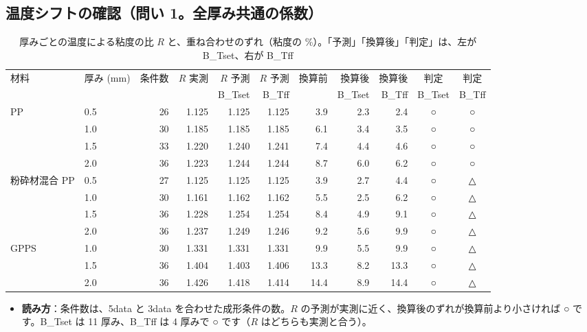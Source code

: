 \documentclass[paper=a4paper,fontsize=10.5pt,line_length=44zw,number_of_lines=38]{jlreq}
\newenvironment{points}{\begin{itemize}[label=$\triangleright$,leftmargin=1.5\zw,itemsep=0.3ex,topsep=0.5ex,parsep=0pt]}{\end{itemize}}
\newcommand{\pt}[1]{\item \textbf{#1}：}
\begin{document}
\subsection{温度シフトの確認（問い 1。全厚み共通の係数）}
\begin{table}[H]
\caption{厚みごとの温度による粘度の比 $R$ と、重ね合わせのずれ（粘度の \%）。「予測」「換算後」「判定」は、左が B\_Tset、右が B\_Tff}\label{tab:check}
\scriptsize
\begin{tabularx}{\linewidth}{@{}llrrrrrrrcc@{}}
\toprule
材料 & 厚み (mm) & 条件数 & $R$ 実測 & $R$ 予測 & $R$ 予測 & 換算前 & 換算後 & 換算後 & 判定 & 判定 \\
 & & & & B\_Tset & B\_Tff & & B\_Tset & B\_Tff & B\_Tset & B\_Tff \\
\midrule
PP & 0.5 & 26 & 1.125 & 1.125 & 1.125 & 3.9 & 2.3 & 2.4 & ○ & ○ \\
 & 1.0 & 30 & 1.185 & 1.185 & 1.185 & 6.1 & 3.4 & 3.5 & ○ & ○ \\
 & 1.5 & 33 & 1.220 & 1.240 & 1.241 & 7.4 & 4.4 & 4.6 & ○ & ○ \\
 & 2.0 & 36 & 1.223 & 1.244 & 1.244 & 8.7 & 6.0 & 6.2 & ○ & ○ \\
\midrule
粉砕材混合 PP & 0.5 & 27 & 1.125 & 1.125 & 1.125 & 3.9 & 2.7 & 4.4 & ○ & △ \\
 & 1.0 & 30 & 1.161 & 1.162 & 1.162 & 5.5 & 2.5 & 6.2 & ○ & △ \\
 & 1.5 & 36 & 1.228 & 1.254 & 1.254 & 8.4 & 4.9 & 9.1 & ○ & △ \\
 & 2.0 & 36 & 1.237 & 1.249 & 1.246 & 9.2 & 5.6 & 9.9 & ○ & △ \\
\midrule
GPPS & 1.0 & 30 & 1.331 & 1.331 & 1.331 & 9.9 & 5.5 & 9.9 & ○ & △ \\
 & 1.5 & 36 & 1.404 & 1.403 & 1.406 & 13.3 & 8.2 & 13.3 & ○ & △ \\
 & 2.0 & 36 & 1.426 & 1.418 & 1.414 & 14.4 & 8.9 & 14.4 & ○ & △ \\

\bottomrule
\end{tabularx}
\end{table}
\begin{points}
\pt{読み方}条件数は、5data と 3data を合わせた成形条件の数。$R$ の予測が実測に近く、換算後のずれが換算前より小さければ ○ です。B\_Tset は 11 厚み、B\_Tff は 4 厚みで ○ です（$R$ はどちらも実測と合う）。
\end{points}
\end{document}
